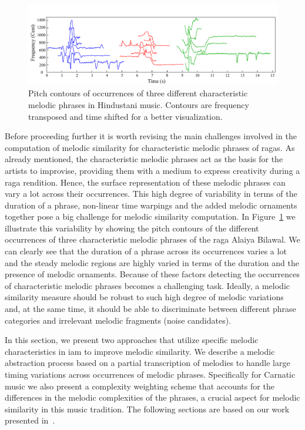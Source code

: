 \begin{figure}
	\begin{center}
		\includegraphics[width=\figSizeHundred]{ch06_patterns/figures/ImprovingSimilarity/phraseClassesExample.pdf}
	\end{center}
	\caption{Pitch contours of occurrences of three different characteristic melodic phrases in Hindustani music. Contours are frequency transposed and time shifted for a better visualization.}
	\label{fig:phraseComplexityExample}
\end{figure}

Before proceeding further it is worth revising the main challenges involved in the computation of melodic similarity for characteristic melodic phrases of \glspl{raga}. As already mentioned, the characteristic melodic phrases act as the basis for the artists to improvise, providing them with a medium to express creativity during a \gls{raga} rendition. Hence, the surface representation of these melodic phrases can vary a lot across their occurrences. This high degree of variability in terms of the duration of a phrase, non-linear time warpings and the added melodic ornaments together pose a big challenge for melodic similarity computation. In Figure~\ref{fig:phraseComplexityExample} we illustrate this variability by showing the pitch contours of the different occurrences of three characteristic melodic phrases of the \gls{raga} Alaiya Bilawal. We can clearly see that the duration of a phrase across its occurrences varies a lot and the steady melodic regions are highly varied in terms of the duration and the presence of melodic ornaments. Because of these factors detecting the occurrences of characteristic melodic phrases becomes a challenging task. Ideally, a melodic similarity measure should be robust to such high degree of melodic variations and, at the same time, it should be able to discriminate between different phrase categories and irrelevant melodic fragments (noise candidates).

In this section, we present two approaches that utilize specific melodic characteristics in \gls{iam} to improve melodic similarity. We describe a melodic abstraction process based on a partial transcription of melodies to handle large timing variations across occurrences of melodic phrases. Specifically for Carnatic music we also present a complexity weighting scheme that accounts for the differences in the melodic complexities of the phrases, a crucial aspect for melodic similarity in this music tradition. The following sections are based on our work presented in~\cite{gulati_ISMIR_2015}.

